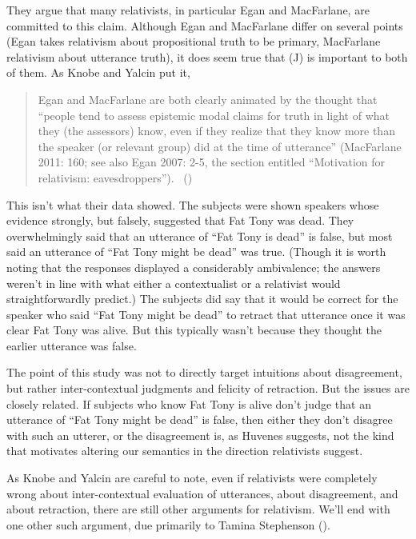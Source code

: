 \documentclass[
  11pt,
  letterpaper,
  DIV=11,
  numbers=noendperiod,
  twoside]{scrartcl}
\begin{document}
They argue that many relativists, in particular Egan and MacFarlane, are
committed to this claim. Although Egan and MacFarlane differ on several
points (Egan takes relativism about propositional truth to be primary,
MacFarlane relativism about utterance truth), it does seem true that (J)
is important to both of them. As Knobe and Yalcin put it,

\begin{quote}
Egan and MacFarlane are both clearly animated by the thought that
``people tend to assess epistemic modal claims for truth in light of
what they (the assessors) know, even if they realize that they know more
than the speaker (or relevant group) did at the time of utterance''
(MacFarlane 2011: 160; see also Egan 2007: 2-5, the section entitled
``Motivation for relativism: eavesdroppers'').
~()
\end{quote}

This isn't what their data showed. The subjects were shown speakers
whose evidence strongly, but falsely, suggested that Fat Tony was dead.
They overwhelmingly said that an utterance of ``Fat Tony is dead'' is
false, but most said an utterance of ``Fat Tony might be dead'' was
true. (Though it is worth noting that the responses displayed a
considerably ambivalence; the answers weren't in line with what either a
contextualist or a relativist would straightforwardly predict.) The
subjects did say that it would be correct for the speaker who said ``Fat
Tony might be dead'' to retract that utterance once it was clear Fat
Tony was alive. But this typically wasn't because they thought the
earlier utterance was false.

The point of this study was not to directly target intuitions about
disagreement, but rather inter-contextual judgments and felicity of
retraction. But the issues are closely related. If subjects who know Fat
Tony is alive don't judge that an utterance of ``Fat Tony might be
dead'' is false, then either they don't disagree with such an utterer,
or the disagreement is, as Huvenes suggests, not the kind that motivates
altering our semantics in the direction relativists suggest.

As Knobe and Yalcin are careful to note, even if relativists were
completely wrong about inter-contextual evaluation of utterances, about
disagreement, and about retraction, there are still other arguments for
relativism. We'll end with one other such argument, due primarily to
Tamina Stephenson ().
\end{document}
